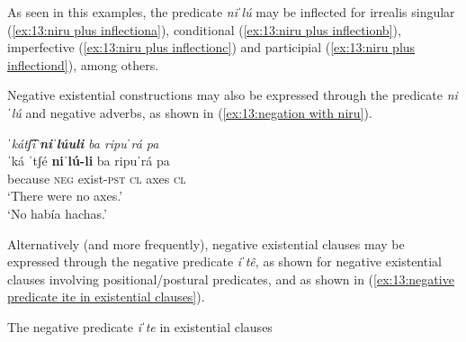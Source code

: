                 \label{ex:13:niru plus inflectiond}
    \z
\z

As seen in this examples, the predicate \textit{niˈlú} may be inflected for irrealis singular (\ref{ex:13:niru plus inflectiona}), conditional (\ref{ex:13:niru plus inflectionb}), imperfective (\ref{ex:13:niru plus inflectionc}) and participial (\ref{ex:13:niru plus inflectiond}), among others.

Negative existential constructions may also be expressed through the predicate \textit{niˈlú} and negative adverbs, as shown in (\ref{ex:13:negation with niru}).

\ea\label{ex:13:negation with niru}

    \textit{ˈkátʃ͡i} \textbf{\textit{niˈlúuli}} \textit{ba   ripuˈrá   pa}\\
    \gll    ˈká  ˈtʃé  \textbf{niˈlú-li}   ba  ripuˈrá  pa\\
            because \textsc{neg}  {exist-\textsc{pst}} \textsc{cl}  axes  \textsc{cl}\\
    \glt    ‘There were no axes.’   \\
    \glt    ‘No había hachas.’   \\
\z

Alternatively (and more frequently), negative existential clauses may be expressed through the negative predicate \textit{iˈtê}, as shown for negative existential clauses involving positional/postural predicates, and as shown in (\ref{ex:13:negative predicate ite in existential clauses}).


\ea\label{ex:13:negative predicate ite in existential clauses}
{The negative predicate \textit{iˈte} in existential clauses}

